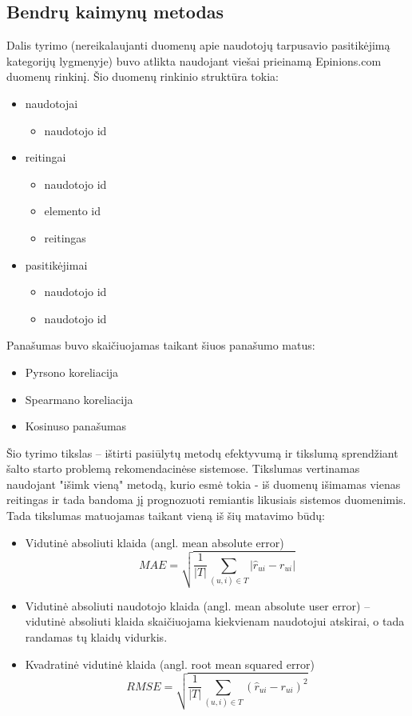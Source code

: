 \documentclass{VUMIFInfMagistrinis}
\begin{document}
\subsection{Bendrų kaimynų metodas}
Dalis tyrimo (nereikalaujanti duomenų apie naudotojų tarpusavio pasitikėjimą kategorijų lygmenyje) buvo atlikta naudojant viešai prieinamą Epinions.com duomenų rinkinį. Šio duomenų rinkinio struktūra tokia:
\begin{itemize}
	\item naudotojai
	\begin{itemize}
		\item naudotojo id
	\end{itemize}
	\item reitingai
	\begin{itemize}
		\item naudotojo id
		\item elemento id
		\item reitingas
	\end{itemize}
	\item pasitikėjimai
	\begin{itemize}
		\item naudotojo id
		\item naudotojo id
	\end{itemize}
\end{itemize}
\indent
Panašumas buvo skaičiuojamas taikant šiuos panašumo matus:
\begin{itemize}
	\item Pyrsono koreliacija
	\item Spearmano koreliacija
	\item Kosinuso panašumas
\end{itemize}
\indent
Šio tyrimo tikslas – ištirti pasiūlytų metodų efektyvumą ir tikslumą sprendžiant šalto starto problemą rekomendacinėse sistemose. Tikslumas vertinamas naudojant "išimk vieną" metodą, kurio esmė tokia - iš duomenų išimamas vienas reitingas ir tada bandoma jį prognozuoti remiantis likusiais sistemos duomenimis. Tada tikslumas matuojamas taikant vieną iš šių matavimo būdų:
\begin{itemize}
	\item Vidutinė absoliuti klaida (angl. mean absolute error)
	\begin{equation}
	MAE = \sqrt{\frac{1}{|T|}\sum\limits_{(u,i)\in T} |\hat{r}_{ui} - r_{ui}|}
	\end{equation}
	\item Vidutinė absoliuti naudotojo klaida (angl. mean absolute user error) – vidutinė absoliuti klaida skaičiuojama kiekvienam naudotojui atskirai, o tada randamas tų klaidų vidurkis.
	\item Kvadratinė vidutinė klaida (angl. root mean squared error)
	\begin{equation}
	RMSE = \sqrt{\frac{1}{|T|}\sum\limits_{(u,i)\in T} (\hat{r}_{ui} - r_{ui})^2}
	\end{equation}
\end{itemize}
\end{document}
